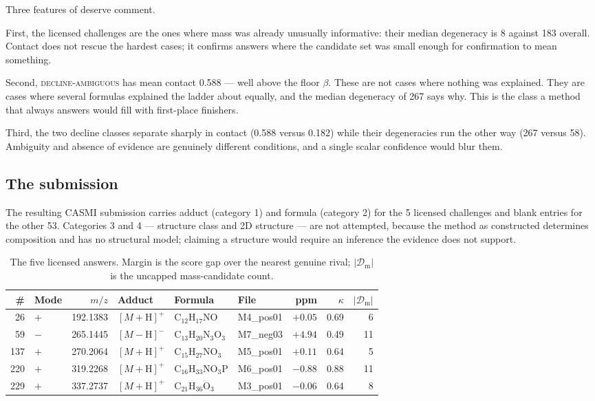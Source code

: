 \documentclass[11pt,twocolumn,a4paper]{article}
\theoremstyle{definition}
\theoremstyle{remark}
\newcommand{\Dmass}{\mathcal{D}_{\mathrm{m}}}
\newcommand{\con}{\kappa}
\begin{document}
Three features of  deserve comment.

First, the licensed challenges are the ones where mass was already unusually
informative: their median degeneracy is 8 against 183 overall. Contact does not
rescue the hardest cases; it confirms answers where the candidate set was small
enough for confirmation to mean something.

Second, \textsc{decline-ambiguous} has mean contact 0.588 --- well above the floor
$\beta$. These are not cases where nothing was explained. They are cases where
several formulas explained the ladder about equally, and the median degeneracy of
267 says why. This is the class a method that always answers would fill with
first-place finishers.

Third, the two decline classes separate sharply in contact (0.588 versus 0.182)
while their degeneracies run the other way (267 versus 58). Ambiguity and absence
of evidence are genuinely different conditions, and a single scalar confidence
would blur them.

\subsection{The submission}

The resulting CASMI submission carries adduct (category 1) and formula
(category 2) for the 5 licensed challenges and blank entries for the other 53.
Categories 3 and 4 --- structure class and 2D structure --- are not attempted,
because the method as constructed determines composition and has no structural
model; claiming a structure would require an inference the evidence does not
support.

\begin{table}[!htbp]
\centering
\caption{The five licensed answers. Margin is the score gap over the nearest
genuine rival; $|\Dmass|$ is the uncapped mass-candidate count.}
\label{tab:licensed}
\small
\begin{tabular}{rlrlllrrr}
\toprule
\# & Mode & $m/z$ & Adduct & Formula & File & ppm & $\con$ & $|\Dmass|$ \\
\midrule
26  & $+$ & 192.1383 & $[M+\mathrm{H}]^+$  & $\mathrm{C_{12}H_{17}NO}$      & M4\_pos01 & $+0.05$ & 0.69 & 6 \\
59  & $-$ & 265.1445 & $[M-\mathrm{H}]^-$  & $\mathrm{C_{13}H_{20}N_3O_3}$  & M7\_neg03 & $+4.94$ & 0.49 & 11 \\
137 & $+$ & 270.2064 & $[M+\mathrm{H}]^+$  & $\mathrm{C_{15}H_{27}NO_3}$    & M5\_pos01 & $+0.11$ & 0.64 & 5 \\
220 & $+$ & 319.2268 & $[M+\mathrm{H}]^+$  & $\mathrm{C_{16}H_{33}NO_3P}$   & M6\_pos01 & $-0.88$ & 0.88 & 11 \\
229 & $+$ & 337.2737 & $[M+\mathrm{H}]^+$  & $\mathrm{C_{21}H_{36}O_3}$     & M3\_pos01 & $-0.06$ & 0.64 & 8 \\
\bottomrule
\end{tabular}
\end{table}
\end{document}
